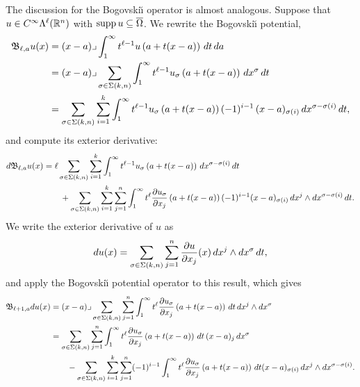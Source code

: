 \documentclass[10pt,letterpaper]{article}
\begin{document}
The discussion for the Bogovski\u{\i} operator is almost analogous. 
Suppose that $u \in C^{\infty}\Lambda^{\ell}({\mathbb R}^n)$ with $\operatorname{supp} u \subseteq \overline\Omega$.
We rewrite the Bogovski\u{\i} potential,
\begin{align*}
    {\mathfrak B}_{\ell,a} u(x) 
    &= 
    (x-a)\lrcorner \int_{1}^\infty t^{\ell-1} u\left(a+t(x-a)\right)\,dt\,da\;
    \\&
    = 
    (x-a)\lrcorner 
    \sum_{\sigma \in \Sigma(k,n)}
    \int_{1}^\infty 
    t^{\ell-1} u_{\sigma}\left(a+t(x-a)\right) \,dx^{\sigma} \,dt 
    \\&
    = 
    \sum_{\sigma \in \Sigma(k,n)} \sum_{i=1}^{k}
    \int_{1}^\infty 
    t^{\ell-1} u_{\sigma}\left(a+t(x-a)\right) (-1)^{i-1} \,(x-a)_{\sigma(i) } \,dx^{\sigma-\sigma(i)} \,dt 
    ,
\end{align*}
and compute its exterior derivative:
\begin{align*}
    d {\mathfrak B}_{\ell,a} u(x) 
    &= 
    \ell 
    \sum_{\sigma \in \Sigma(k,n)} \sum_{i=1}^{k}
    \int_{1}^\infty 
    t^{\ell-1} u_{\sigma}\left(a+t(x-a)\right) \,dx^{\sigma-\sigma(i)} \,dt 
    \\&\qquad
    + 
    \sum_{\sigma \in \Sigma(k,n)} \sum_{i=1}^{k} \sum_{j=1}^{n}
    \int_{1}^\infty 
    t^{\ell} \frac{ \partial u_{\sigma} }{\partial x_{j}}\left(a+t(x-a)\right) (-1)^{i-1} (x-a)_{\sigma(i) } \,dx^{j} \wedge dx^{\sigma-\sigma(i)} \,dt 
    .
\end{align*}
We write the exterior derivative of $u$ as 
\begin{align*}
    d u(x)
    =
    \sum_{\sigma \in \Sigma(k,n)} \sum_{j=1}^{n}
    \frac{ \partial u }{\partial x_{j}}(x) \,dx^{j} \wedge dx^{\sigma} \,dt 
    ,
\end{align*}
and apply the Bogovski\u{\i} potential operator to this result, which gives 
\begin{align*}
    {\mathfrak B}_{\ell+1,a} d u(x)
    &=
    (x-a)\lrcorner 
    \sum_{\sigma \in \Sigma(k,n)} \sum_{j=1}^{n}
    \int_{1}^\infty t^{\ell} \frac{ \partial u_{\sigma} }{\partial x_{j}}\left(a+t(x-a)\right) \,dt 
    \,dx^{j} \wedge dx^{\sigma}
    \\&
    = 
    \sum_{\sigma \in \Sigma(k,n)} \sum_{j=1}^{n}
    \int_{1}^\infty t^{\ell} \frac{ \partial u_{\sigma} }{\partial x_{j}}\left(a+t(x-a)\right) \,dt \,(x-a)_{j} \,dx^{\sigma}
    \\&\qquad 
    - 
    \sum_{\sigma \in \Sigma(k,n)} \sum_{i=1}^{k} \sum_{j=1}^{n}
    (-1)^{i-1}
    \int_{1}^\infty t^{\ell} \frac{ \partial u_{\sigma} }{\partial x_{j}}\left(a+t(x-a)\right) \,dt 
    (x-a)_{\sigma(i)} \,dx^{j} \wedge dx^{\sigma-\sigma(i)}
    .
\end{align*}
\end{document}
